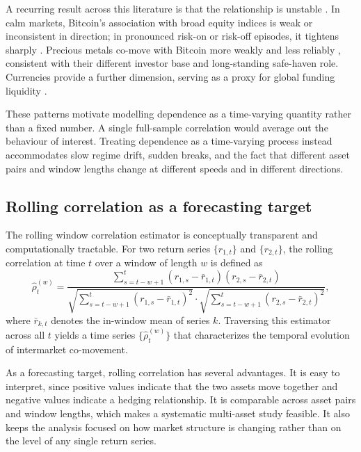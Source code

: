 A recurring result across this literature is that the relationship is unstable \cite{bouri2017hedge, corbet2018exploring}. In calm markets, Bitcoin's association with broad equity indices is weak or inconsistent in direction; in pronounced risk-on or risk-off episodes, it tightens sharply \cite{ji2018network, kristoufek2015main}. Precious metals co-move with Bitcoin more weakly and less reliably \cite{dyhrberg2016bitcoin, klein2018bitcoin}, consistent with their different investor base and long-standing safe-haven role. Currencies provide a further dimension, serving as a proxy for global funding liquidity \cite{corbet2018exploring}.

These patterns motivate modelling dependence as a time-varying quantity rather than a fixed number. A single full-sample correlation would average out the behaviour of interest. Treating dependence as a time-varying process instead accommodates slow regime drift, sudden breaks, and the fact that different asset pairs and window lengths change at different speeds and in different directions.

\subsection{Rolling correlation as a forecasting target}

The rolling window correlation estimator is conceptually transparent and computationally tractable. For two return series $\{r_{1,t}\}$ and $\{r_{2,t}\}$, the rolling correlation at time $t$ over a window of length $w$ is defined as
\begin{equation}
    \hat{\rho}_{t}^{(w)} = \frac{\sum_{s=t-w+1}^{t}(r_{1,s} - \bar{r}_{1,t})(r_{2,s} - \bar{r}_{2,t})}
    {\sqrt{\sum_{s=t-w+1}^{t}(r_{1,s} - \bar{r}_{1,t})^{2}} \cdot
     \sqrt{\sum_{s=t-w+1}^{t}(r_{2,s} - \bar{r}_{2,t})^{2}}},
\end{equation}
where $\bar{r}_{k,t}$ denotes the in-window mean of series $k$. Traversing this estimator across all $t$ yields a time series $\{\hat{\rho}_{t}^{(w)}\}$ that characterizes the temporal evolution of intermarket co-movement.

As a forecasting target, rolling correlation has several advantages. It is easy to interpret, since positive values indicate that the two assets move together and negative values indicate a hedging relationship. It is comparable across asset pairs and window lengths, which makes a systematic multi-asset study feasible. It also keeps the analysis focused on how market structure is changing rather than on the level of any single return series.

